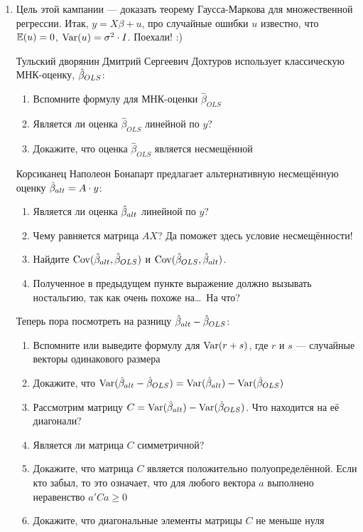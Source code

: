 \documentclass[12pt, a4paper]{article}\usepackage[]{graphicx}\usepackage[]{color}
\begin{document}
\begin{enumerate}

\item Цель этой кампании — доказать теорему Гаусса-Маркова для множественной регрессии. Итак, $y=X\beta + u$, про случайные ошибки $u$ известно, что $\mathbb{E}(u)=0$, $\operatorname{Var}(u)=\sigma^2 \cdot I$. Поехали! :)

Тульский дворянин Дмитрий Сергеевич Дохтуров использует классическую МНК-оценку, $\hat{\beta}_{OLS}$:

\begin{enumerate}
\item Вспомните формулу для МНК-оценки $\hat \beta_{OLS}$
\item Является ли оценка $\hat \beta_{OLS}$ линейной по $y$?
\item Докажите, что оценка $\hat \beta_{OLS}$ является несмещённой
\end{enumerate}

Корсиканец Наполеон Бонапарт предлагает альтернативную несмещённую оценку $\hat{\beta}_{alt} = A\cdot y$:

\begin{enumerate}[resume]
\item Является ли оценка $\hat{\beta}_{alt}$ линейной по $y$?
\item Чему равняется матрица $AX$? Да поможет здесь условие несмещённости!
\item Найдите $\operatorname{Cov}(\hat{\beta}_{alt}, \hat{\beta}_{OLS})$ и $\operatorname{Cov}(\hat{\beta}_{OLS}, \hat{\beta}_{alt})$.
\item Полученное в предыдущем пункте выражение должно вызывать ностальгию, так как очень похоже на\ldots~На что?
\end{enumerate}

Теперь пора посмотреть на разницу $\hat{\beta}_{alt} - \hat{\beta}_{OLS}$:

\begin{enumerate}[resume]
\item Вспомните или выведите формулу для $\operatorname{Var}(r + s)$, где $r$ и $s$ — случайные векторы одинакового размера
\item Докажите, что $\operatorname{Var}(\hat{\beta}_{alt} - \hat{\beta}_{OLS}) = \operatorname{Var}(\hat{\beta}_{alt}) - \operatorname{Var}(\hat{\beta}_{OLS})$
\item Рассмотрим матрицу $C = \operatorname{Var}(\hat{\beta}_{alt}) - \operatorname{Var}(\hat{\beta}_{OLS})$. Что находится на её диагонали?
\item Является ли матрица $C$ симметричной?
\item Докажите, что матрица $C$ является положительно полуопределённой. Если кто забыл, то это означает, что для любого вектора $a$ выполнено неравенство $a'Ca \geq 0$
\item Докажите, что диагональные элементы матрицы $C$ не меньше нуля
\end{enumerate}



\end{enumerate}
\end{document}
